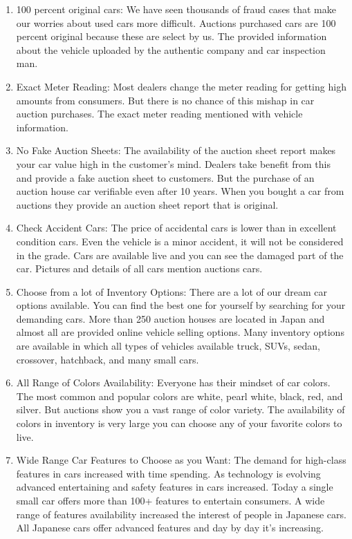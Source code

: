 \documentclass{report}
\begin{document}
\begin{enumerate}
\item 100 percent original cars: We have seen thousands of fraud cases that make our worries     about used cars more difficult. Auctions purchased cars are 100 percent original because these are select by us. The provided information about the vehicle uploaded by the authentic company and car inspection man.
\item Exact Meter Reading:  Most dealers change the meter reading for getting high amounts from consumers. But there is no chance of this mishap in car auction purchases. The exact meter reading mentioned with vehicle information.
\item No Fake Auction Sheets: The availability of the auction sheet report makes your car value high in the customer’s mind. Dealers take benefit from this and provide a fake auction sheet to customers. But the purchase of an auction house car verifiable even after 10 years. When you bought a car from auctions they provide an auction sheet report that is original.
\item Check Accident Cars: The price of accidental cars is lower than in excellent condition cars. Even the vehicle is a minor accident, it will not be considered in the grade. Cars are available live and you can see the damaged part of the car. Pictures and details of all cars mention auctions cars.
\item Choose from a lot of Inventory Options: There are a lot of our dream car options available. You can find the best one for yourself by searching for your demanding cars. More than 250 auction houses are located in Japan and almost all are provided online vehicle selling options. Many inventory options are available in which all types of vehicles available truck, SUVs, sedan, crossover, hatchback, and many small cars.
\item All Range of Colors Availability: Everyone has their mindset of car colors. The most common and popular colors are white, pearl white, black, red, and silver. But auctions show you a vast range of color variety. The availability of colors in inventory is very large you can choose any of your favorite colors to live.
\item Wide Range Car Features to Choose as you Want: The demand for high-class features in cars increased with time spending. As technology is evolving advanced entertaining and safety features in cars increased. Today a single small car offers more than 100+ features to entertain consumers. A wide range of features availability increased the interest of people in Japanese cars. All Japanese cars offer advanced features and day by day it’s increasing.

\end{enumerate}
\end{document}
